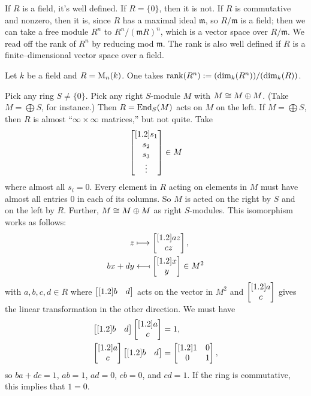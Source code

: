 \documentclass[11pt, oneside,margin=1in]{article}
\begin{document}
If $R$ is a field, it's well defined. If $R=\{0\}$, then it is not. If $R$ is commutative and nonzero, then it is, since $R$ has a maximal ideal $  \mathfrak{m}$, so 
$R/\mathfrak{m}$ is a field; then we can take a free module $R^n$ to $R^n/(\mathfrak{m}R) ^n$, which is a vector space over $R/\mathfrak{m}$. We read off the rank of $R^n$ by reducing mod $ \mathfrak{m}$.
The rank is also well defined if $R$ is a finite--dimensional vector space over a field.
\begin{example}\label{}
Let $k$ be a field and  $R=\operatorname{M}_n(k)$. One takes  $\operatorname{rank}(R^n) := (\dim_k(R^n))/(\dim_k(R))$.
\end{example}
\begin{example}\label{}
Pick any ring $S\ne\{0\}$. Pick any right $S$-module $M$ with $M\cong M\oplus M$. (Take $M=\bigoplus S$, for instance.) Then $R = \operatorname{End}_S(M)$ acts on $M$ on the left. If $M = \bigoplus S$, then $R$ is almost ``$\infty\times\infty$ matrices,'' but not quite. Take \begin{align*}
	\begin{bmatrix} [ 1.2 ] s_1\\s_2\\s_3\\ \vdots\end{bmatrix} \in M
\end{align*}
where almost all $s_i=0$. Every element in $R$ acting on elements in $M$ must have almost all entries $0$ in each of its columns. So $M$ is acted on the right by $S$ and on the left by $R$. Further, $M\cong M\oplus M$ as right $S$-modules. This isomorphism works as follows:
\begin{align*}
	z&\longmapsto\begin{bmatrix} [ 1.2 ] az\\cz\end{bmatrix},\\
	bx+dy &\longmapsfrom \begin{bmatrix} [ 1.2 ] x\\y\end{bmatrix}\in M^2
\end{align*}
with $a,b,c,d\in R$ where $\begin{bmatrix} [ 1.2 ] b&d\end{bmatrix}$ acts on the vector in $M^2$ and $\begin{bmatrix} [ 1.2 ] a\\c\end{bmatrix}$ gives the linear transformation in the other direction. We must have \begin{align*}
	\begin{bmatrix} [ 1.2 ] b&d\end{bmatrix} \begin{bmatrix} [ 1.2 ] a\\c\end{bmatrix}& =1,\\ \begin{bmatrix} [ 1.2 ] a\\c\end{bmatrix}\begin{bmatrix} [ 1.2 ] b&d\end{bmatrix}& = \begin{bmatrix} [ 1.2 ] 1&0\\0&1\end{bmatrix},
\end{align*}
so $ba+dc=1$, $ab=1$, $ad=0$, $cb=0$, and $cd=1$. If the ring is commutative, this implies that $1=0$. 
\end{example}
\end{document}
